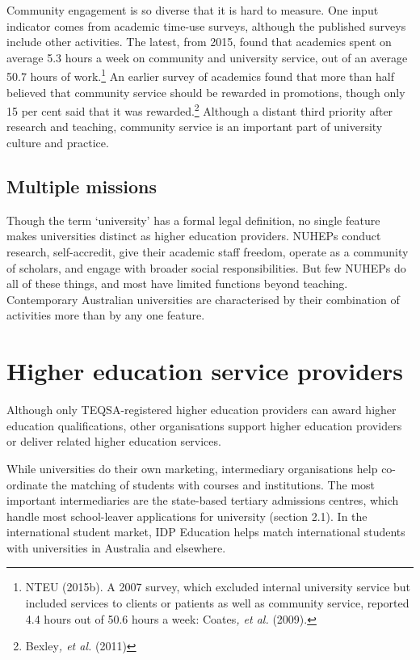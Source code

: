 \documentclass[]{book}
\begin{document}
Community engagement is so diverse that it is hard to measure. One input indicator comes from academic time-use surveys, although the published surveys include other activities. The latest, from 2015, found that academics spent on average 5.3 hours a week on community and university service, out of an average 50.7 hours of work.\footnote{NTEU (2015b). A 2007 survey, which excluded internal university service but included services to clients or patients as well as community service, reported 4.4 hours out of 50.6 hours a week: Coates\emph{, et al.} (2009).} An earlier survey of academics found that more than half believed that community service should be rewarded in promotions, though only 15 per cent said that it was rewarded.\footnote{Bexley\emph{, et al.} (2011)} Although a distant third priority after research and teaching, community service is an important part of university culture and practice.

\hypertarget{multiple-missions}{%
\subsection{Multiple missions}\label{multiple-missions}}

Though the term `university' has a formal legal definition, no single feature makes universities distinct as higher education providers. NUHEPs conduct research, self-accredit, give their academic staff freedom, operate as a community of scholars, and engage with broader social responsibilities. But few NUHEPs do all of these things, and most have limited functions beyond teaching. Contemporary Australian universities are characterised by their combination of activities more than by any one feature.

\hypertarget{higher-education-service-providers}{%
\section{Higher education service providers }\label{higher-education-service-providers}}

Although only TEQSA-registered higher education providers can award higher education qualifications, other organisations support higher education providers or deliver related higher education services.

While universities do their own marketing, intermediary organisations help co-ordinate the matching of students with courses and institutions. The most important intermediaries are the state-based tertiary admissions centres, which handle most school-leaver applications for university (section 2.1). In the international student market, IDP Education helps match international students with universities in Australia and elsewhere.
\end{document}
